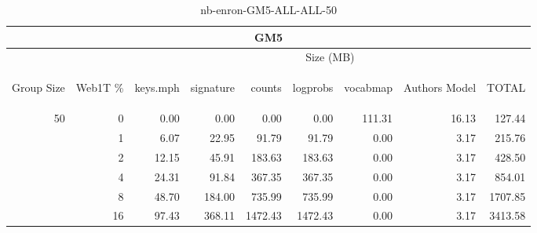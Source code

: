 \begin{center}
\begin{table}[htbp] 
 \begin{center}
\begin{tabular}{ | r | r | r | r | r | r | r | r | r |}
\hline
\multicolumn{9}{|c|}{GM5}\\
\hline
 & & \multicolumn{7}{|c|}{Size (MB)}\\ \cline{3-9}
\begin{sideways}Group Size\end{sideways} & \begin{sideways}Web1T \% \end{sideways} & \begin{sideways}keys.mph\end{sideways} & \begin{sideways}signature\end{sideways} & \begin{sideways}counts\end{sideways} & \begin{sideways}logprobs\end{sideways} & \begin{sideways}vocabmap\end{sideways} & \begin{sideways}Authors Model \end{sideways} & \begin{sideways}TOTAL\end{sideways}\\
\hline
\multirow{5}{*}{50}
 & 0 & 0.00 & 0.00 & 0.00 & 0.00 & 111.31 & 16.13 & 127.44\\ \cline{2-9}
 & 1 & 6.07 & 22.95 & 91.79 & 91.79 & 0.00 & 3.17 & 215.76\\ \cline{2-9}
 & 2 & 12.15 & 45.91 & 183.63 & 183.63 & 0.00 & 3.17 & 428.50\\ \cline{2-9}
 & 4 & 24.31 & 91.84 & 367.35 & 367.35 & 0.00 & 3.17 & 854.01\\ \cline{2-9}
 & 8 & 48.70 & 184.00 & 735.99 & 735.99 & 0.00 & 3.17 & 1707.85\\ \cline{2-9}
 & 16 & 97.43 & 368.11 & 1472.43 & 1472.43 & 0.00 & 3.17 & 3413.58\\ \cline{2-9}
\hline
\end{tabular}
\caption{nb-enron-GM5-ALL-ALL-50}
\label{table:nb-enron-GM5-ALL-ALL-50}
\end{center}
 \end{table}
\end{center}

